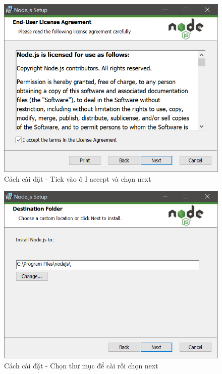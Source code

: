 \documentclass{report}
\begin{document}
\begin{center}
    \begin{figure}[htp]
    \begin{center}
     \includegraphics[scale=0.9]{install2.png}
    \end{center}
    \caption{Cách cài đặt - Tick vào ô I accept và chọn next}
    \label{refhinh1}
    \end{figure}
\end{center}

\begin{center}
    \begin{figure}[htp]
    \begin{center}
     \includegraphics[scale=0.9]{install3.png}
    \end{center}
    \caption{Cách cài đặt - Chọn thư mục để cài rồi chọn next}
    \label{refhinh1}
    \end{figure}
\end{center}
\end{document}
